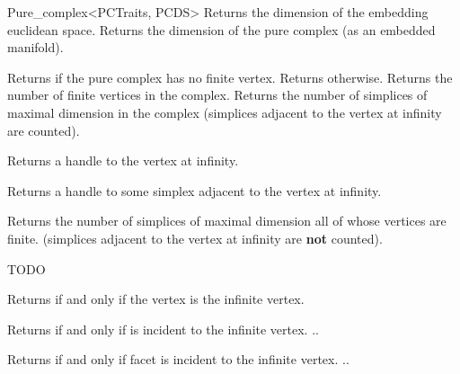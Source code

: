 \begin{ccRefClass}{Pure_complex<PCTraits, PCDS>}
%
{Returns the dimension of the embedding euclidean space.}
\ccGlue
{}%
{Returns the dimension of the pure complex (as an embedded manifold).}

%
{Returns  if the pure complex has no finite vertex. Returns
 otherwise.}
\ccGlue
{}%
{Returns the number of finite vertices in the complex.}
\ccGlue
{}%
{Returns the number of simplices of maximal dimension in the complex
(simplices adjacent to the vertex at infinity are counted).}

%
{Returns a handle to the vertex at infinity.}

%
{Returns a handle to some simplex adjacent to the vertex at infinity.}


%
{Returns the number of simplices of maximal dimension all of whose vertices
are finite. (simplices adjacent to the vertex at infinity are \textbf{not}
counted).}


TODO


{Returns  if and only if the vertex  is the infinite vertex.}

\ccGlue

{Returns  if and only if  is incident to the infinite vertex.
\ccPrecond{}\ccVar..}

\ccGlue

{Returns  if and only if facet  is incident to the infinite
vertex. \ccPrecond{}\ccVar..}

\ccGlue



\end{ccRefClass}
